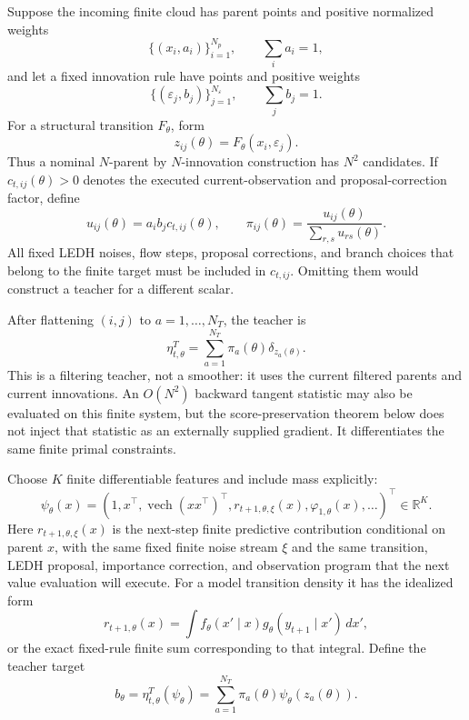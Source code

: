Suppose the incoming finite cloud has parent points and positive normalized
weights
\[
  \{(x_i,a_i)\}_{i=1}^{N_p},\qquad \sum_i a_i=1,
\]
and let a fixed innovation rule have points and positive weights
\[
  \{(\varepsilon_j,b_j)\}_{j=1}^{N_\varepsilon},\qquad
  \sum_j b_j=1.
\]
For a structural transition \(F_\theta\), form
\begin{equation}
\label{eq:bf-ledh-score-aware-teacher-candidates}
  z_{ij}(\theta)=F_\theta(x_i,\varepsilon_j).
\end{equation}
Thus a nominal \(N\)-parent by \(N\)-innovation construction has \(N^2\)
candidates.  If \(c_{t,ij}(\theta)>0\) denotes the executed current-observation
and proposal-correction factor, define
\begin{equation}
\label{eq:bf-ledh-score-aware-teacher-weights}
  u_{ij}(\theta)=a_i b_j c_{t,ij}(\theta),\qquad
  \pi_{ij}(\theta)=\frac{u_{ij}(\theta)}{\sum_{r,s}u_{rs}(\theta)}.
\end{equation}
All fixed LEDH noises, flow steps, proposal corrections, and branch choices that
belong to the finite target must be included in \(c_{t,ij}\).  Omitting them
would construct a teacher for a different scalar.

After flattening \((i,j)\) to \(a=1,\ldots,N_T\), the teacher is
\begin{equation}
\label{eq:bf-ledh-score-aware-teacher-measure}
  \eta^T_{t,\theta}=\sum_{a=1}^{N_T}\pi_a(\theta)
  \delta_{z_a(\theta)}.
\end{equation}
This is a filtering teacher, not a smoother: it uses the current filtered
parents and current innovations.  An \(O(N^2)\) backward tangent statistic may
also be evaluated on this finite system, but the score-preservation theorem
below does not inject that statistic as an externally supplied gradient.  It
differentiates the same finite primal constraints.

Choose \(K\) finite differentiable features and include mass explicitly:
\begin{equation}
\label{eq:bf-ledh-score-aware-feature-vector}
  \psi_\theta(x)
  =\left(1,x^\top,\operatorname{vech}(xx^\top)^\top,
    r_{t+1,\theta,\xi}(x),\varphi_{1,\theta}(x),\ldots\right)^\top
  \in\mathbb R^K.
\end{equation}
Here \(r_{t+1,\theta,\xi}(x)\) is the next-step finite predictive contribution
conditional on parent \(x\), with the same fixed finite noise stream \(\xi\) and
the same transition, LEDH proposal, importance correction, and observation
program that the next value evaluation will execute.  For a model transition
density it has the idealized form
\begin{equation}
\label{eq:bf-ledh-score-aware-predictive-potential}
  r_{t+1,\theta}(x)
  =\int f_\theta(x'\mid x)g_\theta(y_{t+1}\mid x')\,dx',
\end{equation}
or the exact fixed-rule finite sum corresponding to that integral.  Define the
teacher target
\begin{equation}
\label{eq:bf-ledh-score-aware-teacher-target}
  b_\theta
  =\eta^T_{t,\theta}(\psi_\theta)
  =\sum_{a=1}^{N_T}\pi_a(\theta)\psi_\theta(z_a(\theta)).
\end{equation}

